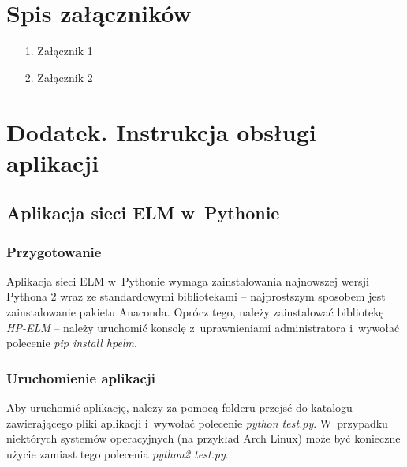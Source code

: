 \documentclass[pl]{minipw} %
\begin{document}
\chapter*{Spis załączników}
\begin{enumerate}
\item[1.] Załącznik 1
\item[2.] Załącznik 2
\end{enumerate}

\chapter*{Dodatek. Instrukcja obsługi aplikacji}
\section*{Aplikacja sieci ELM w~Pythonie}
\subsection*{Przygotowanie}
Aplikacja sieci ELM w~Pythonie wymaga zainstalowania najnowszej wersji Pythona 2 wraz ze standardowymi bibliotekami -- najprostszym sposobem jest zainstalowanie pakietu Anaconda. Oprócz tego, należy zainstalować bibliotekę \textit{HP-ELM} -- należy uruchomić konsolę z~uprawnieniami administratora i~wywołać polecenie \textit{pip install hpelm}. 
\subsection*{Uruchomienie aplikacji}
Aby uruchomić aplikację, należy za pomocą folderu przejsć do katalogu zawierającego pliki aplikacji i~wywołać polecenie \textit{python test.py}. W~przypadku niektórych systemów operacyjnych (na przykład Arch Linux) może być konieczne użycie zamiast tego polecenia \textit{python2 test.py}.
\clearpage
\end{document}

